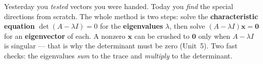 \documentclass[10pt]{article}
\begin{document}
\vspace{0.10in}

\begin{remindbox}
\small Yesterday you \emph{tested} vectors you were handed. Today you \emph{find} the special
directions from scratch. The whole method is two steps: solve the \textbf{characteristic equation}
$\det(A-\lambda I)=0$ for the \textbf{eigenvalues} $\lambda$, then solve $(A-\lambda I)\mathbf{x}=
\mathbf{0}$ for an \textbf{eigenvector} of each. A nonzero $\mathbf{x}$ can be crushed to $\mathbf{0}$
only when $A-\lambda I$ is singular --- that is why the determinant must be zero (Unit~5). Two fast
checks: the eigenvalues \emph{sum} to the trace and \emph{multiply} to the determinant.
\end{remindbox}
\end{document}
